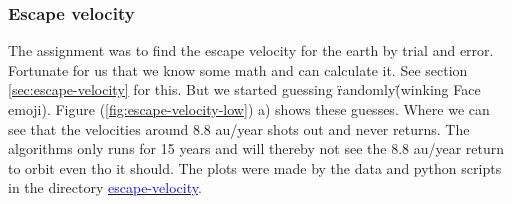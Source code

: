 \subsubsection{Escape velocity}

The assignment was to find the escape velocity for the earth by trial and error. Fortunate for us that we know some math and can calculate it. See section \ref{sec:escape-velocity} for this. But we started guessing \"randomly\" (winking Face emoji). Figure (\ref{fig:escape-velocity-low}) a) shows these guesses. Where we can see that the velocities around 8.8 au/year shots out and never returns. 
The algorithms only runs for 15 years and will thereby not see the 8.8 au/year return to orbit even tho it should. The plots were made by the data and python scripts in the directory \href{https://github.com/erikfsk/Project-3/tree/master/Project3/escape-velocity}{\textcolor{blue}{escape-velocity}}.

